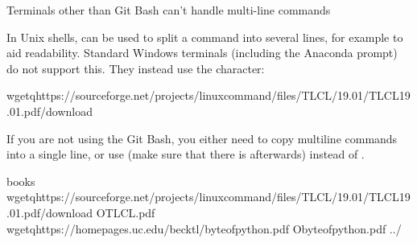 \ignorespaces \begin{windowswit}[label={ww-no-multiline-commands}, before title={\thetcbcounter\ }, float, floatplacement=tbp, check odd page=true]{Terminals other than Git Bash can’t handle multi-line commands}
\label{\detokenize{basics/101-102-populate:ww-no-multiline-commands}}

\sphinxAtStartPar
In Unix shells, \sphinxcode{\sphinxupquote{\textbackslash{}}} can be used to split a command into several lines, for example to aid readability.
Standard Windows terminals (including the Anaconda prompt) do not support this.
They instead use the \sphinxcode{\sphinxupquote{\textasciicircum{}}} character:

\begin{sphinxVerbatim}[commandchars=\\\{\}]
wget\PYGZhy{}qhttps://sourceforge.net/projects/linuxcommand/files/TLCL/19.01/TLCL\PYGZhy{}19.01.pdf/download\PYGZca{}
\end{sphinxVerbatim}

\sphinxAtStartPar
If you are not using the Git Bash, you either need to copy multi\sphinxhyphen{}line commands into a single line, or use \sphinxcode{\sphinxupquote{\textasciicircum{}}} (make sure that there is  afterwards) instead of \sphinxcode{\sphinxupquote{\textbackslash{}}}.


\end{windowswit}

\ignorespaces 
\def\sphinxLiteralBlockLabel{\label{\detokenize{basics/101-102-populate:index-3}}}
\begin{sphinxVerbatim}[commandchars=\\\{\}]
books
wget\PYGZhy{}qhttps://sourceforge.net/projects/linuxcommand/files/TLCL/19.01/TLCL\PYGZhy{}19.01.pdf/download
\PYGZhy{}OTLCL.pdf
wget\PYGZhy{}qhttps://homepages.uc.edu/\PYGZti{}becktl/byte\PYGZus{}of\PYGZus{}python.pdf
\PYGZhy{}Obyte\PYGZhy{}of\PYGZhy{}python.pdf
../
\end{sphinxVerbatim}

